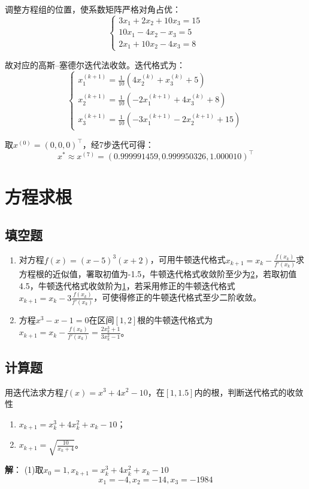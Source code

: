 \documentclass[UTF8,a4paper,11pt,oneside]{ctexbook}
\begin{document}
调整方程组的位置，使系数矩阵严格对角占优：
\[
\begin{cases}
    3x_1+2x_2+10x_3=15\\
    10x_1-4x_2-x_3=5\\
    2x_1+10x_2-4x_3=8
\end{cases}
\]

故对应的高斯--塞德尔迭代法收敛。迭代格式为：
\[
\begin{cases}
    x_1^{(k+1)}=\frac{1}{10}(4x_2^{(k)}+x_3^{(k)}+5)\\
    x_2^{(k+1)}=\frac{1}{10}(-2x_1^{(k+1)}+4x_3^{(k)}+8)\\
    x_3^{(k+1)}=\frac{1}{10}(-3x_1^{(k+1)}-2x_2^{(k+1)}+15)
\end{cases}
\]

取\(x^{(0)}=(0,0,0)^\top\)，经7步迭代可得：
\[
x^*\approx x^{(7)}=(0.999991459,0.999950326,1.000010)^\top
\]

\chapter{方程求根}

\section{填空题}
\begin{enumerate}
    \item 对方程\(f(x)=(x-5)^3(x+2)\)，可用牛顿迭代格式\underline{\(x_{k+1}=x_k-\frac{f(x_k)}{f'(x_k)}\)}求方程根的近似值，署取初值为-1.5，牛顿迭代格式收敛阶至少为\underline{2}，若取初值4.5，牛顿迭代格式收敛阶为\underline{1}，若采用修正的牛顿迭代格式\underline{\(x_{k+1}=x_k-3\frac{f(x_k)}{f'(x_k)}\)}，可使得修正的牛顿迭代格式至少二阶收敛。
    \item 方程\(x^3-x-1=0\)在区间\([1,2]\)根的牛顿迭代格式为\underline{\(x_{k+1}=x_k-\frac{f(x_k)}{f'(x_k)}=\frac{2x_k^3+1}{3x_k^2-1}\)}。
\end{enumerate}

\section{计算题}

用迭代法求方程\(f(x)=x^3+4x^2-10\)，在\([1,1.5]\)内的根，判断送代格式的收敛性
\begin{enumerate}
    \item \(x_{k+1}=x_k^3+4x_k^2+x_k-10\)；
    \item \(x_{k+1}=\sqrt{\frac{10}{x_k+4}}\)。
\end{enumerate}
\textbf{解}：
(1)取\(x_0=1,x_{k+1}=x_k^3+4x_k^2+x_k-10\)
\[
x_1=-4,x_2=-14,x_3=-1984
\]
\end{document}
